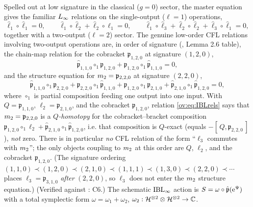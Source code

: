 Spelled out at low signature in the classical ($g=0$) sector, the master equation gives the
familiar $L_\infty$ relations on the single-output ($\ell=1$) operations,
\begin{equation}
	\hat\ell_1\circ\hat\ell_1=0,\qquad
	\hat\ell_1\circ\hat\ell_2+\hat\ell_2\circ\hat\ell_1=0,\qquad
	\hat\ell_1\circ\hat\ell_3+\hat\ell_2\circ\hat\ell_2+\hat\ell_3\circ\hat\ell_1=0,
	\label{ov:eq:Loorels}
\end{equation}
together with a two-output ($\ell=2$) sector. The genuine low-order CFL relations involving
two-output operations are, in order of signature (\cite{Cieliebak:2015:HomologicalAlgebraRelated}, Lemma 2.6 table), the chain-map
relation for the cobracket $\mathfrak{p}_{1,2,0}$ at signature $(1,2,0)$,
\begin{equation}
	\hat{\mathfrak{p}}_{1,1,0}\circ_1\mathfrak{p}_{1,2,0}
	+\mathfrak{p}_{1,2,0}\circ_1\hat{\mathfrak{p}}_{1,1,0}=0,
	\label{ov:eq:IBLchain}
\end{equation}
and the structure equation for $m_2=\mathfrak{p}_{2,2,0}$ at signature $(2,2,0)$,
\begin{equation}
	\boxed{\;
	\hat{\mathfrak{p}}_{1,1,0}\circ_1\mathfrak{p}_{2,2,0}
	+\mathfrak{p}_{2,2,0}\circ_1\hat{\mathfrak{p}}_{1,1,0}
	+\mathfrak{p}_{1,2,0}\circ_1\mathfrak{p}_{2,1,0}
	+\hat{\mathfrak{p}}_{2,1,0}\circ_1\hat{\mathfrak{p}}_{1,2,0}=0,
	\;}
	\label{ov:eq:IBLrels}
\end{equation}
where $\circ_1$ is partial composition feeding one output into one input. With
$Q=\mathfrak{p}_{1,1,0}$, $\ell_2=\mathfrak{p}_{2,1,0}$, and the cobracket
$\mathfrak{p}_{1,2,0}$, relation \eqref{ov:eq:IBLrels} says that $m_2=\mathfrak{p}_{2,2,0}$ is a
\emph{$Q$-homotopy} for the cobracket--bracket composition
$\mathfrak{p}_{1,2,0}\circ_1\ell_2+\hat{\mathfrak{p}}_{2,1,0}\circ_1\hat{\mathfrak{p}}_{1,2,0}$,
i.e. that composition is $Q$-exact (equals
$-[\,Q,\mathfrak{p}_{2,2,0}\,]$), \emph{not} zero. There is in particular \emph{no} CFL relation
of the form ``$\ell_3$ commutes with $m_2$''; the only objects coupling to $m_2$ at this
order are $Q$, $\ell_2$, and the cobracket $\mathfrak{p}_{1,2,0}$. (The signature ordering
$(1,1,0)\prec(1,2,0)\prec(2,1,0)\prec(1,1,1)\prec(1,3,0)\prec(2,2,0)\prec\cdots$ places
$\ell_3=\mathfrak{p}_{3,1,0}$ \emph{after} $(2,2,0)$, so $\ell_3$ does not enter the
$m_2$ structure equation.) (Verified against \cite{Cieliebak:2015:HomologicalAlgebraRelated}: C6.) The schematic $\mathrm{IBL}_\infty$ action
is $S=\omega\circ\hat{\mathfrak{p}}(\mathrm{e}^\Psi)$ with a total symplectic form
$\omega=\omega_1+\omega_2$, $\omega_2:\mathcal{H}^{\otimes2}\otimes\mathcal{H}^{\otimes2}\to\mathbb{C}$.

